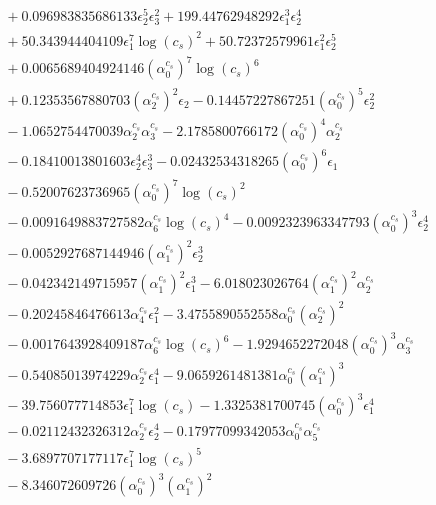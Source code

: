 \documentclass[10pt]{article}
\begin{document}
\begin{align*}
&{}  + 0.096983835686133 \epsilon_{2}^{5} \epsilon_{3}^{2} + 199.44762948292 \epsilon_{1}^{3} \epsilon_{2}^{4} \\
&{}  + 50.343944404109 \epsilon_{1}^{7} \log{\left(c_{s} \right)}^{2} + 50.72372579961 \epsilon_{1}^{2} \epsilon_{2}^{5} \\
&{}  + 0.0065689404924146 \left(\alpha_{0}^{c_s}\right)^{7} \log{\left(c_{s} \right)}^{6} \\
&{}  + 0.12353567880703 \left(\alpha_{2}^{c_s}\right)^{2} \epsilon_{2} - 0.14457227867251 \left(\alpha_{0}^{c_s}\right)^{5} \epsilon_{2}^{2} \\
&{}  - 1.0652754470039 \alpha_{2}^{c_s} \alpha_{3}^{c_s} - 2.1785800766172 \left(\alpha_{0}^{c_s}\right)^{4} \alpha_{2}^{c_s} \\
&{}  - 0.18410013801603 \epsilon_{2}^{4} \epsilon_{3}^{3} - 0.02432534318265 \left(\alpha_{0}^{c_s}\right)^{6} \epsilon_{1} \\
&{}  - 0.52007623736965 \left(\alpha_{0}^{c_s}\right)^{7} \log{\left(c_{s} \right)}^{2} \\
&{}  - 0.0091649883727582 \alpha_{6}^{c_s} \log{\left(c_{s} \right)}^{4} - 0.0092323963347793 \left(\alpha_{0}^{c_s}\right)^{3} \epsilon_{2}^{4} \\
&{}  - 0.0052927687144946 \left(\alpha_{1}^{c_s}\right)^{2} \epsilon_{2}^{3} \\
&{}  - 0.042342149715957 \left(\alpha_{1}^{c_s}\right)^{2} \epsilon_{1}^{3} - 6.018023026764 \left(\alpha_{1}^{c_s}\right)^{2} \alpha_{2}^{c_s} \\
&{}  - 0.20245846476613 \alpha_{4}^{c_s} \epsilon_{1}^{2} - 3.4755890552558 \alpha_{0}^{c_s} \left(\alpha_{2}^{c_s}\right)^{2} \\
&{}  - 0.0017643928409187 \alpha_{6}^{c_s} \log{\left(c_{s} \right)}^{6} - 1.9294652272048 \left(\alpha_{0}^{c_s}\right)^{3} \alpha_{3}^{c_s} \\
&{}  - 0.54085013974229 \alpha_{2}^{c_s} \epsilon_{1}^{4} - 9.0659261481381 \alpha_{0}^{c_s} \left(\alpha_{1}^{c_s}\right)^{3} \\
&{}  - 39.756077714853 \epsilon_{1}^{7} \log{\left(c_{s} \right)} - 1.3325381700745 \left(\alpha_{0}^{c_s}\right)^{3} \epsilon_{1}^{4} \\
&{}  - 0.02112432326312 \alpha_{2}^{c_s} \epsilon_{2}^{4} - 0.17977099342053 \alpha_{0}^{c_s} \alpha_{5}^{c_s} \\
&{}  - 3.6897707177117 \epsilon_{1}^{7} \log{\left(c_{s} \right)}^{5} \\
&{}  - 8.346072609726 \left(\alpha_{0}^{c_s}\right)^{3} \left(\alpha_{1}^{c_s}\right)^{2} \\

\end{align*}
\end{document}
